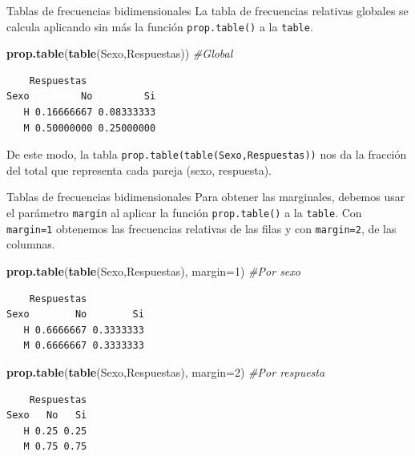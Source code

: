 \documentclass[
  ignorenonframetext,
  aspectratio=169]{beamer}
\newenvironment{Shaded}{\begin{snugshade}}{\end{snugshade}}
\newcommand{\AttributeTok}[1]{\textcolor[rgb]{0.13,0.29,0.53}{#1}}
\newcommand{\CommentTok}[1]{\textcolor[rgb]{0.56,0.35,0.01}{\textit{#1}}}
\newcommand{\DecValTok}[1]{\textcolor[rgb]{0.00,0.00,0.81}{#1}}
\newcommand{\FunctionTok}[1]{\textcolor[rgb]{0.13,0.29,0.53}{\textbf{#1}}}
\newcommand{\NormalTok}[1]{#1}
\begin{document}
\begin{frame}[fragile]{Tablas de frecuencias bidimensionales}
\label{tablas-de-frecuencias-bidimensionales-5}
La tabla de frecuencias relativas globales se calcula aplicando sin más
la función \texttt{prop.table()} a la \texttt{table}.

\begin{Shaded}
\begin{Highlighting}[]
\FunctionTok{prop.table}\NormalTok{(}\FunctionTok{table}\NormalTok{(Sexo,Respuestas)) }\CommentTok{\#Global}
\end{Highlighting}
\end{Shaded}

\begin{verbatim}
    Respuestas
Sexo         No         Si
   H 0.16666667 0.08333333
   M 0.50000000 0.25000000
\end{verbatim}

De este modo, la tabla \texttt{prop.table(table(Sexo,Respuestas))} nos
da la fracción del total que representa cada pareja (sexo, respuesta).
\end{frame}

\begin{frame}[fragile]{Tablas de frecuencias bidimensionales}
\label{tablas-de-frecuencias-bidimensionales-6}
Para obtener las marginales, debemos usar el parámetro \texttt{margin}
al aplicar la función \texttt{prop.table()} a la \texttt{table}. Con
\texttt{margin=1} obtenemos las frecuencias relativas de las filas y con
\texttt{margin=2}, de las columnas.

\begin{Shaded}
\begin{Highlighting}[]
\FunctionTok{prop.table}\NormalTok{(}\FunctionTok{table}\NormalTok{(Sexo,Respuestas), }\AttributeTok{margin=}\DecValTok{1}\NormalTok{) }\CommentTok{\#Por sexo}
\end{Highlighting}
\end{Shaded}

\begin{verbatim}
    Respuestas
Sexo        No        Si
   H 0.6666667 0.3333333
   M 0.6666667 0.3333333
\end{verbatim}

\begin{Shaded}
\begin{Highlighting}[]
\FunctionTok{prop.table}\NormalTok{(}\FunctionTok{table}\NormalTok{(Sexo,Respuestas), }\AttributeTok{margin=}\DecValTok{2}\NormalTok{) }\CommentTok{\#Por respuesta}
\end{Highlighting}
\end{Shaded}

\begin{verbatim}
    Respuestas
Sexo   No   Si
   H 0.25 0.25
   M 0.75 0.75
\end{verbatim}
\end{frame}
\end{document}
